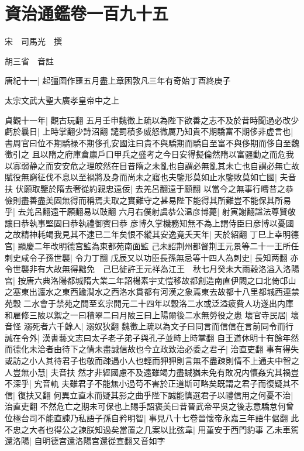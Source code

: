 \section{資治通鑑卷一百九十五}
宋　司馬光　撰

胡三省　音註

唐紀十一|{
	起彊圉作噩五月盡上章困敦凡三年有奇始丁酉終庚子}


太宗文武大聖大廣孝皇帝中之上

貞觀十一年|{
	觀古玩翻}
五月壬申魏徵上疏以為陛下欲善之志不及於昔時聞過必改少虧於曩日|{
	上時掌翻少詩沼翻}
譴罰積多威怒微厲乃知貴不期驕富不期侈非虚言也|{
	書周官曰位不期驕禄不期侈孔安國注曰貴不與驕期而驕自至富不與侈期而侈自至魏徵引之}
且以隋之府庫倉廪戶口甲兵之盛考之今日安得擬倫然隋以富疆動之而危我以寡弱静之而安安危之理皎然在目昔隋之未亂也自謂必無亂其未亡也自謂必無亡故賦役無窮征伐不息以至禍將及身而尚未之寤也夫鑒形莫如止水鑒敗莫如亡國|{
	夫音扶}
伏願取鑒於隋去奢從約親忠遠佞|{
	去羌呂翻遠于願翻}
以當今之無事行疇昔之恭儉則盡善盡美固無得而稱焉夫取之實難守之甚易陛下能得其所難豈不能保其所易乎|{
	去羌呂翻遠干願翻易以豉翻}
六月右僕射虞恭公温彦博薨|{
	射寅謝翻諡法尊賢敬讓曰恭執事堅固曰恭執禮御賓曰恭}
彦博久掌機務知無不為上謂侍臣曰彦博以憂國之故精神耗竭我見其不逮已二年矣恨不縱其安逸竟夭天年|{
	天於紹翻}
丁巳上幸明德宫|{
	顯慶二年改明德宫監為東都苑南面監}
己未詔荆州都督荆王元景等二十一王所任刺史咸令子孫世襲|{
	令力丁翻}
戊辰又以功臣長孫無忌等十四人為刺史|{
	長知两翻}
亦令世襲非有大故無得黜免　己巳徙許王元祥為江王　秋七月癸未大雨穀洛溢入洛陽宫|{
	按唐六典洛陽都城隋大業二年詔楊素宇丈愷移故都創造南直伊闕之口北倚邙山之塞東出瀍水之東西踰澗水之西洛水貫都有河漢之象焉東去故都十八里都城西連禁苑穀二水會于禁苑之間至玄宗開元二十四年以穀洛二水或泛溢疲費人功遂出内庫和雇修三陂以禦之一曰積翠二曰月陂三曰上陽爾後二水無勞役之患}
壞官寺民居|{
	壞音怪}
溺死者六千餘人|{
	溺奴狄翻}
魏徵上疏以為文子曰同言而信信在言前同令而行誠在令外|{
	漢書藝文志曰太子老子弟子與孔子並時上時掌翻}
自王道休明十有餘年然而德化未洽者由待下之情未盡誠信故也今立政致治必委之君子|{
	治直吏翻}
事有得失或訪之小人其待君子也敬而疎遇小人也輕而狎狎則言無不盡疎則情不上通夫中智之人豈無小慧|{
	夫音扶}
然才非經國慮不及遠雖竭力盡誠猶未免有敗况内懷姦宄其禍豈不深乎|{
	宄音軌}
夫雖君子不能無小過苟不害於正道斯可略矣既謂之君子而復疑其不信|{
	復扶又翻}
何異立直木而疑其影之曲乎陛下誠能慎選君子以禮信用之何憂不治|{
	治直吏翻}
不然危亡之期未可保也上賜手詔褒美曰昔晉武帝平吳之後志意驕怠何曾位極台司不能直諫乃私語子孫自矜明智|{
	事見八十七卷晉懷帝永嘉三年語牛倨翻}
此不忠之大者也得公之諫朕知過矣當置之几案以比弦韋|{
	用堇安于西門豹事}
乙未車駕還洛陽|{
	自明德宫還洛陽宫還從宣翻又音如字}
